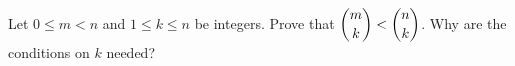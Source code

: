 Let $0\le m<n$ and $1\le k\le n$ be integers. Prove that $\dbinom mk<\dbinom nk$. Why are the conditions on $k$ needed?
